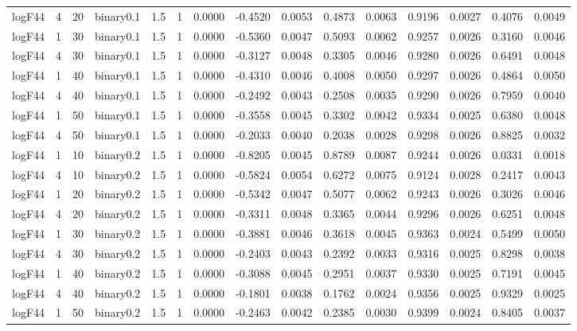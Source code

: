\begin{longtable}{rrrrrrrrrrrrrrr}
  logF44 & 4 & 20 & binary0.1 & 1.5 & 1 & 0.0000 & -0.4520 & 0.0053 & 0.4873 & 0.0063 & 0.9196 & 0.0027 & 0.4076 & 0.0049 \\ 
  logF44 & 1 & 30 & binary0.1 & 1.5 & 1 & 0.0000 & -0.5360 & 0.0047 & 0.5093 & 0.0062 & 0.9257 & 0.0026 & 0.3160 & 0.0046 \\ 
  logF44 & 4 & 30 & binary0.1 & 1.5 & 1 & 0.0000 & -0.3127 & 0.0048 & 0.3305 & 0.0046 & 0.9280 & 0.0026 & 0.6491 & 0.0048 \\ 
  logF44 & 1 & 40 & binary0.1 & 1.5 & 1 & 0.0000 & -0.4310 & 0.0046 & 0.4008 & 0.0050 & 0.9297 & 0.0026 & 0.4864 & 0.0050 \\ 
  logF44 & 4 & 40 & binary0.1 & 1.5 & 1 & 0.0000 & -0.2492 & 0.0043 & 0.2508 & 0.0035 & 0.9290 & 0.0026 & 0.7959 & 0.0040 \\ 
  logF44 & 1 & 50 & binary0.1 & 1.5 & 1 & 0.0000 & -0.3558 & 0.0045 & 0.3302 & 0.0042 & 0.9334 & 0.0025 & 0.6380 & 0.0048 \\ 
  logF44 & 4 & 50 & binary0.1 & 1.5 & 1 & 0.0000 & -0.2033 & 0.0040 & 0.2038 & 0.0028 & 0.9298 & 0.0026 & 0.8825 & 0.0032 \\ 
  logF44 & 1 & 10 & binary0.2 & 1.5 & 1 & 0.0000 & -0.8205 & 0.0045 & 0.8789 & 0.0087 & 0.9244 & 0.0026 & 0.0331 & 0.0018 \\ 
  logF44 & 4 & 10 & binary0.2 & 1.5 & 1 & 0.0000 & -0.5824 & 0.0054 & 0.6272 & 0.0075 & 0.9124 & 0.0028 & 0.2417 & 0.0043 \\ 
  logF44 & 1 & 20 & binary0.2 & 1.5 & 1 & 0.0000 & -0.5342 & 0.0047 & 0.5077 & 0.0062 & 0.9243 & 0.0026 & 0.3026 & 0.0046 \\ 
  logF44 & 4 & 20 & binary0.2 & 1.5 & 1 & 0.0000 & -0.3311 & 0.0048 & 0.3365 & 0.0044 & 0.9296 & 0.0026 & 0.6251 & 0.0048 \\ 
  logF44 & 1 & 30 & binary0.2 & 1.5 & 1 & 0.0000 & -0.3881 & 0.0046 & 0.3618 & 0.0045 & 0.9363 & 0.0024 & 0.5499 & 0.0050 \\ 
  logF44 & 4 & 30 & binary0.2 & 1.5 & 1 & 0.0000 & -0.2403 & 0.0043 & 0.2392 & 0.0033 & 0.9316 & 0.0025 & 0.8298 & 0.0038 \\ 
  logF44 & 1 & 40 & binary0.2 & 1.5 & 1 & 0.0000 & -0.3088 & 0.0045 & 0.2951 & 0.0037 & 0.9330 & 0.0025 & 0.7191 & 0.0045 \\ 
  logF44 & 4 & 40 & binary0.2 & 1.5 & 1 & 0.0000 & -0.1801 & 0.0038 & 0.1762 & 0.0024 & 0.9356 & 0.0025 & 0.9329 & 0.0025 \\ 
  logF44 & 1 & 50 & binary0.2 & 1.5 & 1 & 0.0000 & -0.2463 & 0.0042 & 0.2385 & 0.0030 & 0.9399 & 0.0024 & 0.8405 & 0.0037 \\ 

\end{longtable}
